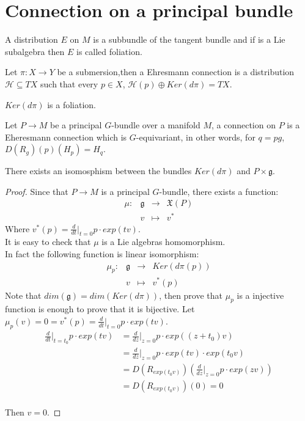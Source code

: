 \section{Connection on a principal bundle}
\begin{definition}
	A distribution $E$ on $M$ is a subbundle of the tangent bundle and if   is a Lie subalgebra then $E$ is called foliation. 
\end{definition}
	\begin{definition}
	Let  $\pi: X \to Y$ be a submersion,then  a Ehresmann connection is a distribution $\mathcal{H} \subseteq TX$ such that every $p\in X$, $\mathcal{H}(p) \oplus Ker(d\pi)=TX$.
\end{definition}
\begin{theorem}
	$Ker(d\pi)$ is a foliation.
\end{theorem}


\begin{definition}
	Let $P \to M$ be a principal $G$-bundle over a manifold $M$, a connection on $P$ is a Eheresmann connection  which is $G$-equivariant, in other words, for $q=pg$, $D(R_{g})(p)(H_{p})=H_{q}$.
\end{definition}

\begin{theorem}
	There exists an isomosphism between the bundles $Ker(d\pi)$ and $P \times \mathfrak{g}$.
\end{theorem}
\begin{proof}
	Since that  $P \to M$ is a principal  $G$-bundle, there exists a function: 
	$$\begin{array}{crcl}
	\mu: & \mathfrak{g} & \longrightarrow & \mathfrak{X}(P) \\
	& v & \mapsto & v^{*}
	\end{array}$$
	Where  $v^{*}(p)=\frac{d}{dt} \big |_{t=0} p\cdot exp(tv)$.\\
	It is easy to check that  $\mu$ is a Lie algebras homomorphism. \\
	In fact the following function is linear isomorphism:
	 $$\begin{array}{crcl}
	\mu_{p} :& \mathfrak{g} & \longrightarrow & Ker(d\pi(p)) \\
	& v & \mapsto & v^{*}(p)
	\end{array}$$
	Note that $dim(\mathfrak{g})=dim(Ker(d\pi))$, then prove that $\mu_{p}$ is a injective function is enough to prove that it is bijective.
	Let $\mu_{p}(v)=0=v^{*}(p)=\frac{d}{dt}\big|_{t=0} p\cdot exp(tv) $. \\
	\begin{align*}
	\frac{d}{dt}\big|_{t=t_{0}} p\cdot exp(tv)&=\frac{d}{dz}\big|_{z=0} p\cdot exp((z+t_{0})v)\\&=\frac{d}{dz}\big|_{z=0} p\cdot exp(tv) \cdot exp(t_{0}v)\\&=D\left(R_{exp(t_{0}v)}\right) \left(\frac{d}{dz}\big|_{z=0} p\cdot exp(zv)\right)\\&=D(R_{exp(t_{0}v)})(0)=0
	\end{align*}\\
	Then $v=0$.
\end{proof}

